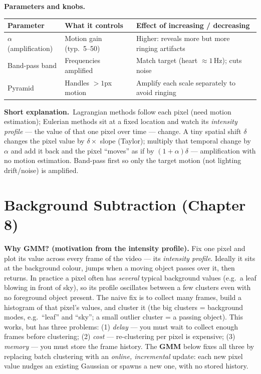 \documentclass[10pt]{article}
\makeatletter
\newcommand{\Knobs}{\par\smallskip\textbf{Parameters and knobs.}\par\nopagebreak}
\newcommand{\ShortExp}{\par\smallskip\textbf{Short explanation.}\ }
\newenvironment{ptable}{\begin{center}\small\begin{tabular}{@{}p{2.5cm} p{5.9cm} p{6.2cm}@{}}\toprule
Parameter & What it controls & Effect of increasing / decreasing \\ \midrule}
{\bottomrule\end{tabular}\end{center}}
\makeatother
\begin{document}
\Knobs
\begin{ptable}
$\alpha$ (amplification) & Motion gain (typ.\ 5--50) & Higher: reveals more but more ringing artifacts \\
Band-pass band & Frequencies amplified & Match target (heart $\approx1$\,Hz); cuts noise \\
Pyramid & Handles $>\!1$px motion & Amplify each scale separately to avoid ringing \\
\end{ptable}
\ShortExp Lagrangian methods follow each pixel (need motion estimation); Eulerian methods sit at a fixed
location and watch its \emph{intensity profile} --- the value of that one pixel over time --- change.
A tiny spatial shift $\delta$ changes the pixel value by
$\delta\times$ slope (Taylor); multiply that temporal change by $\alpha$ and add it back and the pixel
``moves'' as if by $(1+\alpha)\delta$ --- amplification with no motion estimation. Band-pass first so only
the target motion (not lighting drift/noise) is amplified.

\newpage
\section{Background Subtraction (Chapter 8)}

\textbf{Why GMM? (motivation from the intensity profile).} Fix one pixel and plot its value across every
frame of the video --- its \emph{intensity profile}. Ideally it sits at the background colour, jumps when a
moving object passes over it, then returns. In practice a pixel often has \emph{several} typical background
values (e.g.\ a leaf blowing in front of sky), so its profile oscillates between a few clusters even with no
foreground object present. The naive fix is to collect many frames, build a histogram of that pixel's
values, and cluster it (the big clusters = background modes, e.g.\ ``leaf'' and ``sky''; a small outlier
cluster = a passing object). This works, but has three problems: (1) \emph{delay} --- you must wait to
collect enough frames before clustering; (2) \emph{cost} --- re-clustering per pixel is expensive; (3)
\emph{memory} --- you must store the frame history. The \textbf{GMM} below fixes all three by replacing
batch clustering with an \emph{online, incremental} update: each new pixel value nudges an existing Gaussian
or spawns a new one, with no stored history.
\end{document}
